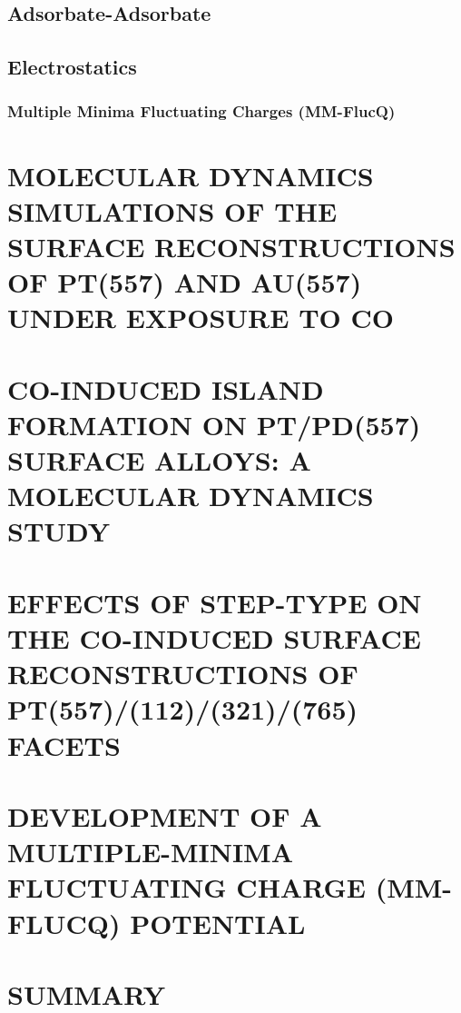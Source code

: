 \documentclass[final, numrefs]{nddiss2e}
\begin{document}
\section{Adsorbate-Adsorbate}



\section{Electrostatics}


\subsection{Multiple Minima Fluctuating Charges (MM-FlucQ)}


\chapter{MOLECULAR DYNAMICS SIMULATIONS OF THE SURFACE RECONSTRUCTIONS OF PT(557) AND AU(557) UNDER EXPOSURE TO CO}


\chapter{CO-INDUCED ISLAND FORMATION ON PT/PD(557) SURFACE ALLOYS: A MOLECULAR DYNAMICS STUDY}


\chapter{EFFECTS OF STEP-TYPE ON THE CO-INDUCED SURFACE RECONSTRUCTIONS OF PT(557)/(112)/(321)/(765) FACETS}


\chapter{DEVELOPMENT OF A MULTIPLE-MINIMA FLUCTUATING CHARGE (MM-FLUCQ) POTENTIAL}


\chapter{SUMMARY}


\appendix


\backmatter              %



\end{document}
